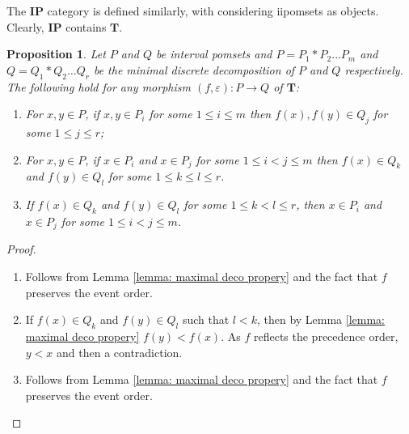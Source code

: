 \documentclass[11pt,a4paper,oldfontcommands]{memoir}
\newcommand*{\intpom}{\TrO}
\newcommand{\TrO}{\mathbf{T}}
\newtheorem{proposition}[definition]{Proposition}
\begin{document}
The $\mathbf{IP}$ category is defined similarly, with considering iipomsets as objects. Clearly, $\mathbf{IP}$ contains $\TrO$.

\begin{proposition}\label{prop: properties of f from opt.deco}
  Let $P$ and $Q$ be interval pomsets and $P=P_1*P_2 \dots P_m$ and $Q=Q_1*Q_2 \dots Q_r$ be the minimal discrete decomposition of $P$ and $Q$ respectively. The following hold for any morphism $(f,\varepsilon): P \to Q$ of $\intpom$:
   \begin{enumerate}
       \item For $x,y \in P $, if $x,y \in P_i$ for some $1 \leq i \leq m $ then $f(x), f(y) \in Q_j$ for some $1 \leq j \leq r $;
        \item For $x,y \in P $, if $x \in P_i$ and $x \in P_j$ for some $1 \leq i < j \leq m $ then $f(x) \in Q_k$ and $f(y) \in Q_l$ for some $1 \leq k \leq l \leq r $.
       \item If $f(x) \in Q_k$ and $f(y) \in Q_l$ for some $1 \leq k < l \leq r $, then $x \in P_i$ and $x \in P_j$ for some $1 \leq i < j \leq m $.
    \end{enumerate}
\end{proposition}
\begin{proof}
   \begin{enumerate}
       \item Follows from Lemma \ref{lemma: maximal deco propery} and the fact that $f$ preserves the event order.
        \item If $f(x) \in Q_k$ and $f(y) \in Q_l$ such that $ l < k  $, then by Lemma \ref{lemma: maximal deco propery} $f(y)<f(x)$. As $f$ reflects the precedence order, $y<x$ and then a contradiction.
        \item Follows from Lemma \ref{lemma: maximal deco propery} and the fact that $f$ preserves the event order.
    \end{enumerate}
\end{proof}
\end{document}

